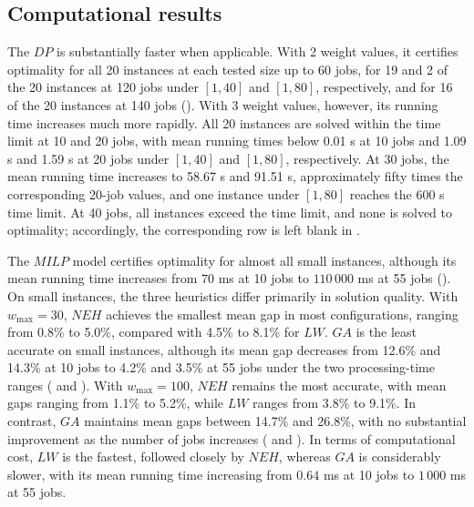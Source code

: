 \documentclass[12pt]{article} \textheight=24.5cm \textwidth=16.5cm \parskip = 0.165cm
\begin{document}
\begin{sloppypar}
        \subsection{Computational results} \label{sec:results}
        
        The $DP$ is substantially faster when applicable.
        With 2 weight values, it certifies optimality for all 20 instances at each tested size up to 60 jobs, for 19 and 2 of the 20 instances at 120 jobs under $[1,40]$ and $[1,80]$, respectively, and for 16 of the 20 instances at 140 jobs ().
        With 3 weight values, however, its running time increases much more rapidly.
        All 20 instances are solved within the time limit at 10 and 20 jobs, with mean running times below 0.01 s at 10 jobs and 1.09 s and 1.59 s at 20 jobs under $[1,40]$ and $[1,80]$, respectively.
        At 30 jobs, the mean running time increases to 58.67 s and 91.51 s, approximately fifty times the corresponding 20-job values, and one instance under $[1,80]$ reaches the 600 s time limit.
        At 40 jobs, all instances exceed the time limit, and none is solved to optimality; accordingly, the corresponding row is left blank in .

        The $MILP$ model certifies optimality for almost all small instances, although its mean running time increases from $70$ ms at 10 jobs to $110\,000$ ms at 55 jobs ().
        On small instances, the three heuristics differ primarily in solution quality.
        With $w_{\max}=30$, $NEH$ achieves the smallest mean gap in most configurations, ranging from 0.8\% to 5.0\%, compared with 4.5\% to 8.1\% for $LW$.
        $GA$ is the least accurate on small instances, although its mean gap decreases from 12.6\% and 14.3\% at 10 jobs to 4.2\% and 3.5\% at 55 jobs under the two processing-time ranges ( and ).
        With $w_{\max}=100$, $NEH$ remains the most accurate, with mean gaps ranging from 1.1\% to 5.2\%, while $LW$ ranges from 3.8\% to 9.1\%. 
        In contrast, $GA$ maintains mean gaps between 14.7\% and 26.8\%, with no substantial improvement as the number of jobs increases ( and ).
        In terms of computational cost, $LW$ is the fastest, followed closely by $NEH$, whereas $GA$ is considerably slower, with its mean running time increasing from $0.64$ ms at 10 jobs to $1\,000$ ms at 55 jobs.


\end{sloppypar}
\end{document}
